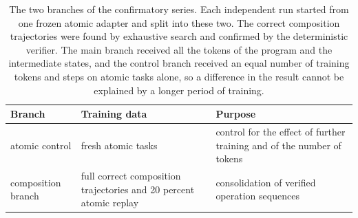 \begin{table}[!tbh]
\centering\footnotesize\setlength{\tabcolsep}{5pt}
\begin{tabular}{|l|p{.30\linewidth}|p{.34\linewidth}|}
\hline
\textbf{Branch} & \textbf{Training data} & \textbf{Purpose} \\
\hline
atomic control & fresh atomic tasks & control for the effect of further training and of the number of tokens \\ \hline
composition branch & full correct composition trajectories and 20 percent atomic replay & consolidation of verified operation sequences \\ \hline
\end{tabular}
\caption{The two branches of the confirmatory series. Each independent run started
from one frozen atomic adapter and split into these two. The correct composition
trajectories were found by exhaustive search and confirmed by the deterministic
verifier. The main branch received all the tokens of the program and the
intermediate states, and the control branch received an equal number of training
tokens and steps on atomic tasks alone, so a difference in the result cannot be
explained by a longer period of training.}
\label{tab:branches}
\end{table}
